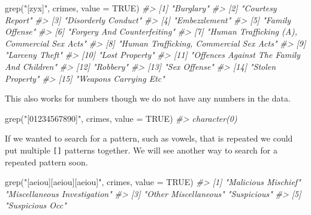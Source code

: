 \documentclass[
  12pt,
]{book}
\newenvironment{Shaded}{\begin{snugshade}}{\end{snugshade}}
\newcommand{\AttributeTok}[1]{\textcolor[rgb]{0.61,0.61,0.61}{#1}}
\newcommand{\CommentTok}[1]{\textcolor[rgb]{0.37,0.37,0.37}{\textit{#1}}}
\newcommand{\ConstantTok}[1]{\textcolor[rgb]{0,0,0}{#1}}
\newcommand{\FunctionTok}[1]{\textcolor[rgb]{0,0,0}{#1}}
\newcommand{\NormalTok}[1]{#1}
\newcommand{\StringTok}[1]{\textcolor[rgb]{0.5,0.5,0.5}{#1}}
\begin{document}
\begin{Shaded}
\begin{Highlighting}[]
\FunctionTok{grep}\NormalTok{(}\StringTok{"[zyx]"}\NormalTok{, crimes, }\AttributeTok{value =} \ConstantTok{TRUE}\NormalTok{)}
\CommentTok{\#\textgreater{}  [1] "Burglary"                                  }
\CommentTok{\#\textgreater{}  [2] "Courtesy Report"                           }
\CommentTok{\#\textgreater{}  [3] "Disorderly Conduct"                        }
\CommentTok{\#\textgreater{}  [4] "Embezzlement"                              }
\CommentTok{\#\textgreater{}  [5] "Family Offense"                            }
\CommentTok{\#\textgreater{}  [6] "Forgery And Counterfeiting"                }
\CommentTok{\#\textgreater{}  [7] "Human Trafficking (A), Commercial Sex Acts"}
\CommentTok{\#\textgreater{}  [8] "Human Trafficking, Commercial Sex Acts"    }
\CommentTok{\#\textgreater{}  [9] "Larceny Theft"                             }
\CommentTok{\#\textgreater{} [10] "Lost Property"                             }
\CommentTok{\#\textgreater{} [11] "Offences Against The Family And Children"  }
\CommentTok{\#\textgreater{} [12] "Robbery"                                   }
\CommentTok{\#\textgreater{} [13] "Sex Offense"                               }
\CommentTok{\#\textgreater{} [14] "Stolen Property"                           }
\CommentTok{\#\textgreater{} [15] "Weapons Carrying Etc"}
\end{Highlighting}
\end{Shaded}

This also works for numbers though we do not have any numbers in the data.

\begin{Shaded}
\begin{Highlighting}[]
\FunctionTok{grep}\NormalTok{(}\StringTok{"[01234567890]"}\NormalTok{, crimes, }\AttributeTok{value =} \ConstantTok{TRUE}\NormalTok{)}
\CommentTok{\#\textgreater{} character(0)}
\end{Highlighting}
\end{Shaded}

If we wanted to search for a pattern, such as vowels, that is repeated we could put multiple \texttt{{[}{]}} patterns together. We will see another way to search for a repeated pattern soon.

\begin{Shaded}
\begin{Highlighting}[]
\FunctionTok{grep}\NormalTok{(}\StringTok{"[aeiou][aeiou][aeiou]"}\NormalTok{, crimes, }\AttributeTok{value =} \ConstantTok{TRUE}\NormalTok{)}
\CommentTok{\#\textgreater{} [1] "Malicious Mischief"          "Miscellaneous Investigation"}
\CommentTok{\#\textgreater{} [3] "Other Miscellaneous"         "Suspicious"                 }
\CommentTok{\#\textgreater{} [5] "Suspicious Occ"}
\end{Highlighting}
\end{Shaded}
\end{document}
